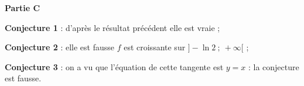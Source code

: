 \medskip

\textbf{Partie C}

\medskip

\textbf{Conjecture 1} : d'après le résultat précédent elle est vraie ;

\textbf{Conjecture 2} : elle est fausse $f$ est croissante sur $]- \ln 2~;~+ \infty[$ ;

\textbf{Conjecture 3} : on a vu que l'équation de cette tangente est $y = x$ : la conjecture est fausse.

\medskip


